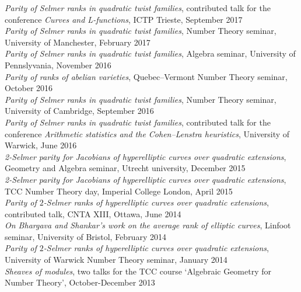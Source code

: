 \documentclass{res}
\begin{document}
\begin{resume}
{\it Parity of Selmer ranks in quadratic twist families}, contributed talk for the conference {\it Curves and L-functions}, ICTP Trieste, September 2017  \medskip \\
{\it Parity of Selmer ranks in quadratic twist families}, Number Theory seminar, University of Manchester, February 2017  \medskip \\
{\it Parity of Selmer ranks in quadratic twist families}, Algebra seminar, University of Pennslyvania, November 2016  \medskip \\
{\it Parity of ranks of abelian varieties}, Quebec--Vermont Number Theory seminar, October 2016  \medskip \\
{\it Parity of Selmer ranks in quadratic twist families}, Number Theory seminar, University of Cambridge, September 2016  \medskip \\
{\it Parity of Selmer ranks in quadratic twist families}, contributed talk for the conference  {\it Arithmetic statistics and the Cohen--Lenstra heuristics}, University of Warwick, June 2016  \medskip \\
{\it 2-Selmer parity for Jacobians of hyperelliptic curves over quadratic extensions}, Geometry and Algebra seminar, Utrecht university, December 2015  \medskip \\
{\it 2-Selmer parity for Jacobians of hyperelliptic curves over quadratic extensions}, TCC Number Theory day, Imperial College London, April 2015  \medskip \\
 {\it Parity of $2$-Selmer ranks of hyperelliptic curves over quadratic extensions}, contributed talk, CNTA XIII, Ottawa, June 2014  \medskip \\
 {\it On Bhargava and Shankar's work on the average rank of elliptic curves}, Linfoot seminar, University of Bristol, February 2014  \medskip \\
 {\it Parity of $2$-Selmer ranks of hyperelliptic curves over quadratic extensions}, University of Warwick Number Theory seminar, January 2014  \medskip \\
{\it Sheaves of modules}, two talks for the TCC course `Algebraic Geometry for Number Theory', October-December 2013  \medskip \\
       

\end{resume}
\end{document}
